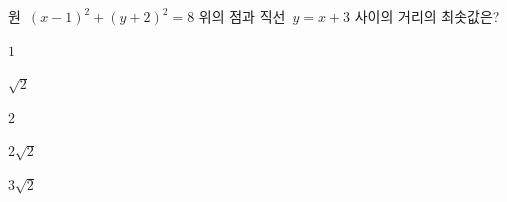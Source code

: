 원~$(x-1)^2+(y+2)^2=8$ 위의 점과 직선~$y=x+3$ 사이의 거리의 최솟값은?
\begin{choices32}{\rule[-3ex]{0pt}{8ex}$1$}{\rule[-3ex]{0pt}{8ex}$\sqrt{2}$}{\rule[-3ex]{0pt}{8ex}$2$}{\rule[-3ex]{0pt}{8ex}$2\sqrt{2}$}{\rule[-3ex]{0pt}{8ex}$3\sqrt{2}$}\end{choices32}
